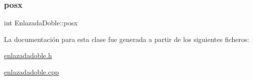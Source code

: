 \mbox{\label{class_enlazada_doble_ac4cff0c052eef87b0211923a625daa4d}} 
\subsubsection{\texorpdfstring{posx}{posx}}
{\footnotesize\ttfamily int Enlazada\+Doble\+::posx}



La documentación para esta clase fue generada a partir de los siguientes ficheros\+:\begin{DoxyCompactItemize}
\item 
\mbox{\hyperlink{enlazadadoble_8h}{enlazadadoble.\+h}}\item 
\mbox{\hyperlink{enlazadadoble_8cpp}{enlazadadoble.\+cpp}}\end{DoxyCompactItemize}
